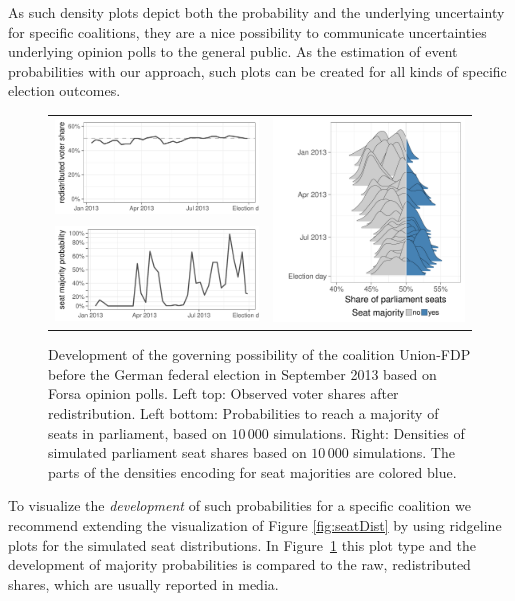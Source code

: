 \documentclass[smallcondensed]{svjour3}     %
\begin{document}
As such density plots depict both the probability and the underlying
uncertainty for specific coalitions, they are a nice possibility to communicate
uncertainties underlying opinion polls to the general public. As the estimation
of event probabilities with our approach, such plots can be created for all
kinds of specific election outcomes.

\begin{figure}[H]\centering
\begin{tabular}{ll}
\includegraphics[height=.15\textwidth]{figures/2013_forsa_cdufdp_rawSharesRedist.pdf}
&
\multirow{2}{*}[13ex]{\includegraphics[height=30ex]{figures/2013_forsa_cdufdp_ridgeline.pdf}}
\\
\includegraphics[height=.15\textwidth]{figures/2013_forsa_cdufdp_prob.pdf}
\end{tabular}
\caption{Development of the governing possibility of the coalition Union-FDP before the German federal election in September 2013 based on Forsa opinion polls.
Left top: Observed voter shares after redistribution. Left bottom: Probabilities to reach a majority of seats in parliament, based on $10\,000$ simulations. Right: Densities of simulated parliament seat shares based on $10\,000$ simulations. The parts of the densities encoding for seat majorities are colored blue.
\label{fig:seatDist_time}
}
\end{figure}

To visualize the {\it development} of such probabilities
for a specific coalition we recommend extending the visualization of Figure \ref{fig:seatDist} by using ridgeline plots \citep{wilke_2017} for the simulated seat distributions. In Figure~\ref{fig:seatDist_time} this plot type and the development of majority probabilities is compared to
the raw, redistributed shares, which are usually reported in media.
\end{document}
